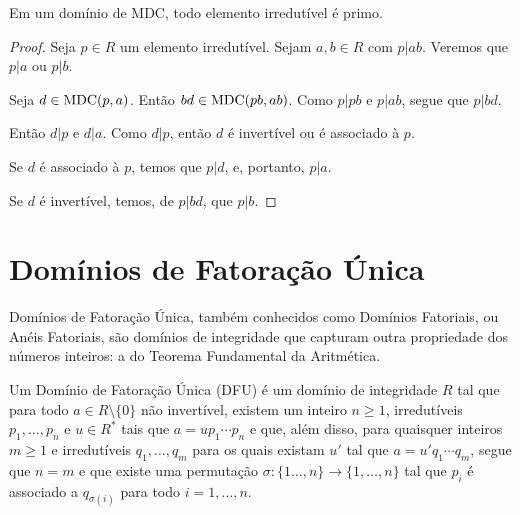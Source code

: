 \begin{lemma}
    Em um domínio de MDC, todo elemento irredutível é primo.
    \end{lemma}
    
\begin{proof}
    Seja $p \in R$ um elemento irredutível.
    Sejam $a, b \in R$ com $p|ab$.
    Veremos que $p|a$ ou $p|b$.

    Seja $d\in\operatorname{MDC}(p, a)$.
    Então $bd\in \operatorname{MDC}(pb, ab)$.
    Como $p|pb$ e $p|ab$, segue que $p|bd$.

    Então $d|p$ e $d|a$.
    Como $d|p$, então $d$ é invertível ou é associado à $p$.

    Se $d$ é associado à $p$, temos que $p|d$, e, portanto, $p|a$.

    Se $d$ é invertível, temos, de $p|bd$, que $p|b$.
\end{proof}

\section{Domínios de Fatoração Única}
Domínios de Fatoração Única, também conhecidos como Domínios Fatoriais, ou Anéis Fatoriais, são domínios de integridade que capturam outra propriedade dos números inteiros:
a do Teorema Fundamental da Aritmética.

\begin{definition}
    Um Domínio de Fatoração Única (DFU) é um domínio de integridade $R$ tal que para todo $a\in R\setminus \{0\}$ não invertível, existem um inteiro $n\geq 1$, irredutíveis $p_1, \dots, p_n$ e $u\in R^*$ tais que $a=up_1\cdots p_n$ e que, além disso, para quaisquer inteiros $m\geq 1$ e irredutíveis $q_1, \dots, q_m$ para os quais existam $u'$ tal que $a=u'q_1\cdots q_m$, segue que $n=m$ e que existe uma permutação $\sigma:\{1\dots, n\}\rightarrow \{1, \dots, n\}$ tal que $p_i$ é associado a $q_{\sigma(i)}$ para todo $i=1, \dots, n$.
\end{definition}

